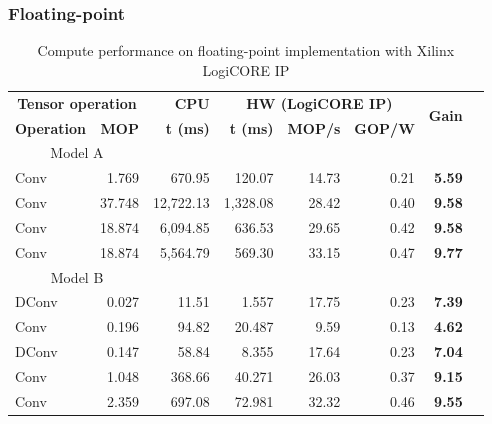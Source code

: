 \subsubsection{Floating-point}
\begin{table}[!htp]\centering
	\caption{Compute performance on floating-point implementation with Xilinx LogiCORE IP}\label{tab:performace_float_logicore }
	\scriptsize
	\begin{tabular}{lrrrrrrr}\toprule
		\multicolumn{2}{c}{\textbf{Tensor operation}} &\textbf{CPU} &\multicolumn{3}{c}{\textbf{HW (LogiCORE IP)}} &\multirow{2}{*}{\textbf{Gain}} \\\cmidrule{1-6}
		\textbf{Operation} &\textbf{MOP} &\textbf{t (ms)} &\textbf{t (ms)} &\textbf{MOP/s} &\textbf{GOP/W} & \\\midrule
		\multicolumn{2}{c}{Model A} & & & & & \\
		Conv &1.769 &670.95 &120.07 &14.73 &0.21 &\textbf{5.59} \\
		Conv &37.748 &12,722.13 &1,328.08 &28.42 &0.40 &\textbf{9.58} \\
		Conv &18.874 &6,094.85 &636.53 &29.65 &0.42 &\textbf{9.58} \\
		Conv &18.874 &5,564.79 &569.30 &33.15 &0.47 &\textbf{9.77} \\
		\multicolumn{2}{c}{Model B} & & & & & \\
		DConv &0.027 &11.51 &1.557 &17.75 &0.23 &\textbf{7.39} \\
		Conv &0.196 &94.82 &20.487 &9.59 &0.13 &\textbf{4.62} \\
		DConv &0.147 &58.84 &8.355 &17.64 &0.23 &\textbf{7.04} \\
		Conv &1.048 &368.66 &40.271 &26.03 &0.37 &\textbf{9.15} \\
		Conv &2.359 &697.08 &72.981 &32.32 &0.46 &\textbf{9.55} \\
		\bottomrule
	\end{tabular}
\end{table}

